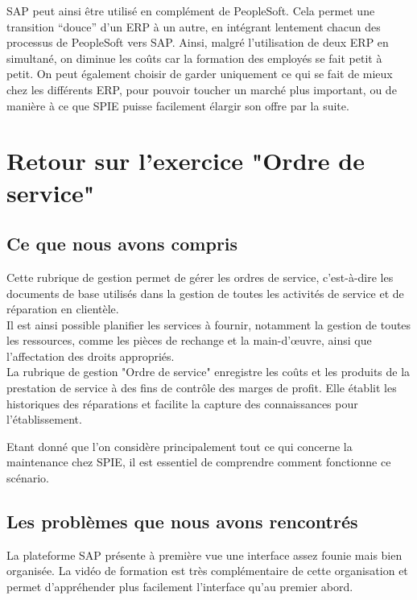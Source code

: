 SAP peut ainsi être utilisé en complément de PeopleSoft. Cela permet une transition “douce” d'un ERP à un autre, en intégrant lentement chacun des processus de PeopleSoft vers SAP. Ainsi, malgré l'utilisation de deux ERP en simultané, on diminue les coûts car la formation des employés se fait petit à petit. On peut également choisir de garder uniquement ce qui se fait de mieux chez les différents ERP, pour pouvoir toucher un marché plus important, ou de manière à ce que SPIE puisse facilement élargir son offre par la suite.

\section{Retour sur l’exercice "Ordre de service"}

\subsection{Ce que nous avons compris}

Cette rubrique de gestion permet de gérer les ordres de service, c'est-à-dire les documents de base utilisés dans la gestion de toutes les activités de service et de réparation en clientèle. \\

Il est ainsi possible planifier les services à fournir, notamment la gestion de toutes les ressources, comme les pièces de rechange et la main-d'\oe{}uvre, ainsi que l'affectation des droits appropriés. \\ 

La rubrique de gestion "Ordre de service" enregistre les coûts et les produits de la prestation de service à des fins de contrôle des marges de profit. Elle établit les historiques des réparations et facilite la capture des connaissances pour l'établissement.

Etant donné que l'on considère principalement tout ce qui concerne la maintenance chez SPIE, il est essentiel de comprendre comment fonctionne ce scénario.

\subsection{Les problèmes que nous avons rencontrés}

La plateforme SAP présente à première vue une interface assez founie mais bien organisée. La vidéo de formation est très complémentaire de cette organisation et permet d'appréhender plus facilement l'interface qu'au premier abord. \\


